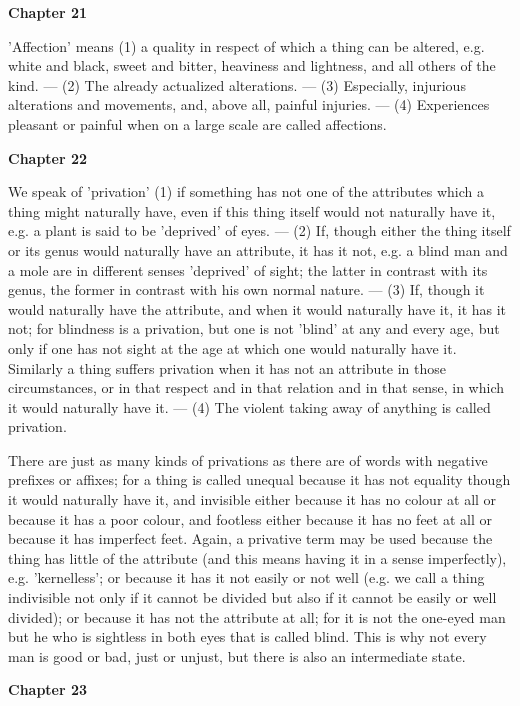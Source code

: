 \textbf{Chapter 21}

'Affection' means (1) a quality in respect of which a thing can be altered, e.g. white and black, sweet and bitter, heaviness and lightness, and all others of the kind. — (2) The already actualized alterations. — (3) Especially, injurious alterations and movements, and, above all, painful injuries. — (4) Experiences pleasant or painful when on a large scale are called affections.

\textbf{Chapter 22}

We speak of 'privation' (1) if something has not one of the attributes which a thing might naturally have, even if this thing itself would not naturally have it, e.g. a plant is said to be 'deprived' of eyes. — (2) If, though either the thing itself or its genus would naturally have an attribute, it has it not, e.g. a blind man and a mole are in different senses 'deprived' of sight; the latter in contrast with its genus, the former in contrast with his own normal nature. — (3) If, though it would naturally have the attribute, and when it would naturally have it, it has it not; for blindness is a privation, but one is not 'blind' at any and every age, but only if one has not sight at the age at which one would naturally have it. Similarly a thing suffers privation when it has not an attribute in those circumstances, or in that respect and in that relation and in that sense, in which it would naturally have it. — (4) The violent taking away of anything is called privation.

There are just as many kinds of privations as there are of words with negative prefixes or affixes; for a thing is called unequal because it has not equality though it would naturally have it, and invisible either because it has no colour at all or because it has a poor colour, and footless either because it has no feet at all or because it has imperfect feet. Again, a privative term may be used because the thing has little of the attribute (and this means having it in a sense imperfectly), e.g. 'kernelless'; or because it has it not easily or not well (e.g. we call a thing indivisible not only if it cannot be divided but also if it cannot be easily or well divided); or because it has not the attribute at all; for it is not the one-eyed man but he who is sightless in both eyes that is called blind. This is why not every man is good or bad, just or unjust, but there is also an intermediate state.

\textbf{Chapter 23}

